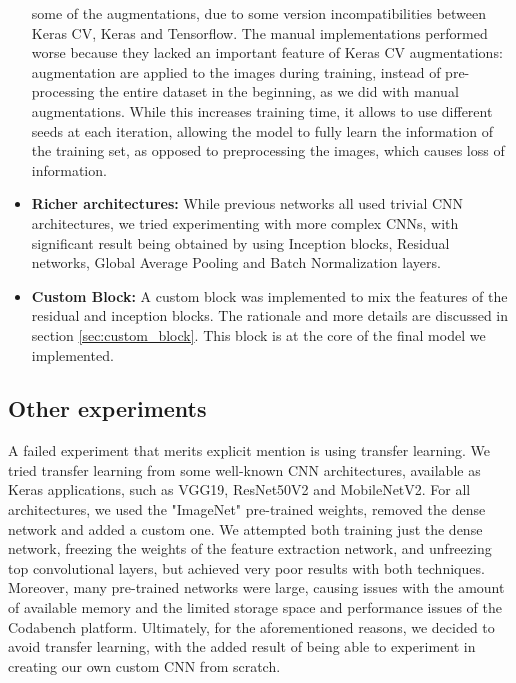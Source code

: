 \documentclass[11pt]{article}
\begin{document}
\begin{multicols}{2}
\begin{itemize}
                  some of the augmentations, due to some version incompatibilities
                  between Keras CV, Keras and Tensorflow. The manual implementations 
                  performed worse because they lacked an important feature of Keras CV
                  augmentations: augmentation are applied to the images during training, 
                  instead of pre-processing the entire dataset in the beginning, as we
                  did with manual augmentations. While this increases training time,
                  it allows to use different seeds at each iteration, allowing the model
                  to fully learn the information of the training set, as opposed to
                  preprocessing the images, which causes loss of information.
            \item \textbf{Richer architectures:} While previous networks all used trivial 
                  CNN architectures, we tried experimenting with more complex CNNs,
                  with significant result being obtained by using Inception blocks,
                  Residual networks, Global Average Pooling and Batch Normalization layers.
            \item \textbf{Custom Block:} A custom block was implemented to mix the 
                  features of the residual and inception blocks. The rationale and more
                  details are discussed in section \ref{sec:custom_block}. This block 
                  is at the core of the final model we implemented.
      \end{itemize}

      \subsection{Other experiments}

      A failed experiment that merits explicit mention is using transfer learning.
      We tried transfer learning from some well-known CNN architectures, available
      as Keras applications, such as VGG19, ResNet50V2 and MobileNetV2. For all
      architectures, we used the "ImageNet" pre-trained weights, removed the dense
      network and added a custom one. We attempted both training just the dense
      network, freezing the weights of the feature extraction network, and unfreezing
      top convolutional layers, but achieved very poor results with both techniques.
      Moreover, many pre-trained networks were large, causing issues with the amount
      of available memory and the limited storage space and performance issues of the
      Codabench platform. Ultimately, for the aforementioned reasons, we decided to 
      avoid transfer learning, with the added result of being able to experiment in
      creating our own custom CNN from scratch.


\end{multicols}
\end{document}
